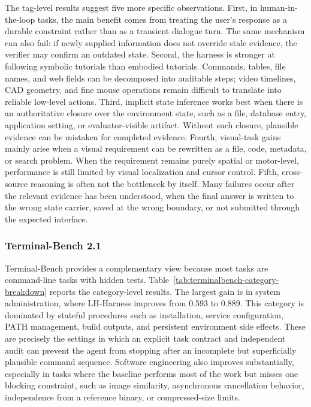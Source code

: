The tag-level results suggest five more specific observations. First, in human-in-the-loop tasks, the main benefit comes from treating the user's response as a durable constraint rather than as a transient dialogue turn. The same mechanism can also fail: if newly supplied information does not override stale evidence, the verifier may confirm an outdated state. Second, the harness is stronger at following symbolic tutorials than embodied tutorials. Commands, tables, file names, and web fields can be decomposed into auditable steps; video timelines, CAD geometry, and fine mouse operations remain difficult to translate into reliable low-level actions. Third, implicit state inference works best when there is an authoritative closure over the environment state, such as a file, database entry, application setting, or evaluator-visible artifact. Without such closure, plausible evidence can be mistaken for completed evidence. Fourth, visual-task gains mainly arise when a visual requirement can be rewritten as a file, code, metadata, or search problem. When the requirement remains purely spatial or motor-level, performance is still limited by visual localization and cursor control. Fifth, cross-source reasoning is often not the bottleneck by itself. Many failures occur after the relevant evidence has been understood, when the final answer is written to the wrong state carrier, saved at the wrong boundary, or not submitted through the expected interface.

\subsubsection{Terminal-Bench 2.1}
\label{app:fine-grained-terminalbench}

Terminal-Bench provides a complementary view because most tasks are command-line tasks with hidden tests. Table~\ref{tab:terminalbench-category-breakdown} reports the category-level results. The largest gain is in system administration, where LH-Harness improves from 0.593 to 0.889. This category is dominated by stateful procedures such as installation, service configuration, PATH management, build outputs, and persistent environment side effects. These are precisely the settings in which an explicit task contract and independent audit can prevent the agent from stopping after an incomplete but superficially plausible command sequence. Software engineering also improves substantially, especially in tasks where the baseline performs most of the work but misses one blocking constraint, such as image similarity, asynchronous cancellation behavior, independence from a reference binary, or compressed-size limits.

